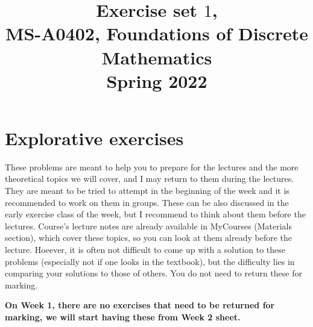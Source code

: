 \documentclass{amsart}
\title{Exercise set $1$, \\ MS-A0402, Foundations of Discrete Mathematics\\ Spring 2022}
\theoremstyle{definition} \newtheorem*{definition}{Definition}
\theoremstyle{remark} \newtheorem*{ex}{Example}
\begin{document}
\hspace{-1cm}
\maketitle
 
\section*{Explorative exercises}
These problems are meant to help you to prepare for the lectures and the more theoretical topics we will cover, and I may return to them during the lectures. They are meant to be tried to attempt in the beginning of the week and it is recommended to work on them in groups. These can be also discussed in the early exercise class of the week, but I recommend to think about them before the lectures. Course’s lecture notes are already available in MyCourses (Materials section), which cover these topics, so you can look at them already before the lecture. Hoeever, it is often not difficult to come up with a solution to these problems (especially not if one looks in the textbook), but the difficulty lies in comparing your solutions to those of others. You do not need to return these for marking.

\textbf{On Week 1, there are no exercises that need to be returned for marking, we will start having these from Week 2 sheet.}
\end{document}
